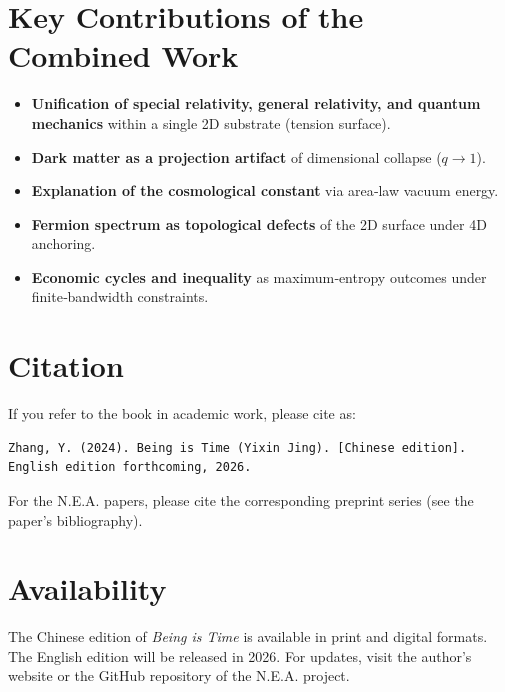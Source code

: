 \documentclass[12pt,a4paper]{article}
\begin{document}
\section*{Key Contributions of the Combined Work}
\begin{itemize}
    \item \textbf{Unification of special relativity, general relativity, and quantum mechanics} within a single 2D substrate (tension surface).
    \item \textbf{Dark matter as a projection artifact} of dimensional collapse (\(q \to 1\)).
    \item \textbf{Explanation of the cosmological constant} via area‑law vacuum energy.
    \item \textbf{Fermion spectrum as topological defects} of the 2D surface under 4D anchoring.
    \item \textbf{Economic cycles and inequality} as maximum‑entropy outcomes under finite‑bandwidth constraints.
\end{itemize}

\section*{Citation}
If you refer to the book in academic work, please cite as:
\begin{verbatim}
Zhang, Y. (2024). Being is Time (Yixin Jing). [Chinese edition]. 
English edition forthcoming, 2026.
\end{verbatim}

For the N.E.A. papers, please cite the corresponding preprint series (see the paper’s bibliography).

\section*{Availability}
The Chinese edition of \textit{Being is Time} is available in print and digital formats. The English edition will be released in 2026. For updates, visit the author’s website or the GitHub repository of the N.E.A. project.
\end{document}
